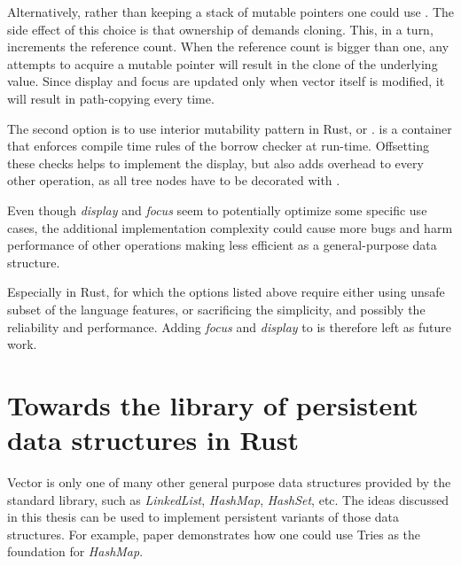 Alternatively, rather than keeping a stack of mutable pointers one could use \rc{}. The side effect of this choice is that ownership of \rc{} demands cloning. This, in a turn, increments the reference count. When the reference count is bigger than one, any attempts to acquire a mutable pointer will result in the clone of the underlying value. Since display and focus are updated only when vector itself is modified, it will result in path-copying every time.

The second option is to use interior mutability pattern in Rust, or .  is a container that enforces compile time rules of the borrow checker at run-time. Offsetting these checks helps to implement the display, but also adds overhead to every other operation, as all tree nodes have to be decorated with . 

Even though \emph{display} and \emph{focus} seem to potentially optimize some specific use cases, the additional implementation complexity could cause more bugs and harm performance of other operations making \rrbtree{} less efficient as a general-purpose data structure. 

Especially in Rust, for which the options listed above require either using unsafe subset of the language features, or sacrificing the simplicity, and possibly the reliability and performance. Adding \emph{focus} and \emph{display} to \rrbvec{} is therefore left as future work.

\section{Towards the library of persistent data structures in Rust}

Vector is only one of many other general purpose data structures provided by the standard library, such as \emph{LinkedList}, \emph{HashMap}, \emph{HashSet}, etc. The ideas discussed in this thesis can be used to implement persistent variants of those data structures. For example,  paper demonstrates how one could use Tries as the foundation for \emph{HashMap}. 
